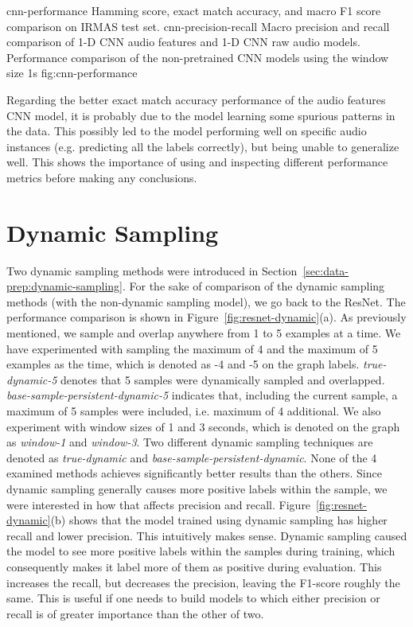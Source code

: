 \asideimages{14cm}{14cm}
	    {cnn-performance}
	    {Hamming score, exact match accuracy, and macro F1 score comparison on IRMAS test set.}
	    {cnn-precision-recall}
	    {Macro precision and recall comparison of 1-D CNN audio features and 1-D CNN raw audio models.}
	    {Performance comparison of the non-pretrained CNN models using the window size 1s}
	    {fig:cnn-performance}

Regarding the better exact match accuracy performance of the audio features CNN model, it is probably due to the model learning some spurious patterns in the data. This possibly led to the model performing well on specific audio instances (e.g. predicting all the labels correctly), but being unable to generalize well. This shows the importance of using and inspecting different performance metrics before making any conclusions. 


\section{Dynamic Sampling}
\label{sec:eval:dynamic-sampling}
Two dynamic sampling methods were introduced in Section~\ref{sec:data-prep:dynamic-sampling}. For the sake of comparison of the dynamic sampling methods (with the non-dynamic sampling model), we go back to the ResNet. The performance comparison is shown in Figure~\ref{fig:resnet-dynamic}(a). As previously mentioned, we sample and overlap anywhere from 1 to 5 examples at a time. We have experimented with sampling the maximum of 4 and the maximum of 5 examples as the time, which is denoted as -4 and -5 on the graph labels. \textit{true-dynamic-5} denotes that 5 samples were dynamically sampled and overlapped. \textit{base-sample-persistent-dynamic-5} indicates that, including the current sample, a maximum of 5 samples were included, i.e. maximum of 4 additional. We also experiment with window sizes of 1 and 3 seconds, which is denoted on the graph as \textit{window-1} and \textit{window-3}. Two different dynamic sampling techniques are denoted as \textit{true-dynamic} and \textit{base-sample-persistent-dynamic}. None of the 4 examined methods achieves significantly better results than the others. Since dynamic sampling generally causes more positive labels within the sample, we were interested in how that affects precision and recall. Figure~\ref{fig:resnet-dynamic}(b) shows that the model trained using dynamic sampling has higher recall and lower precision. This intuitively makes sense. Dynamic sampling caused the model to see more positive labels within the samples during training, which consequently makes it label more of them as positive during evaluation. This increases the recall, but decreases the precision, leaving the F1-score roughly the same. This is useful if one needs to build models to which either precision or recall is of greater importance than the other of two.

